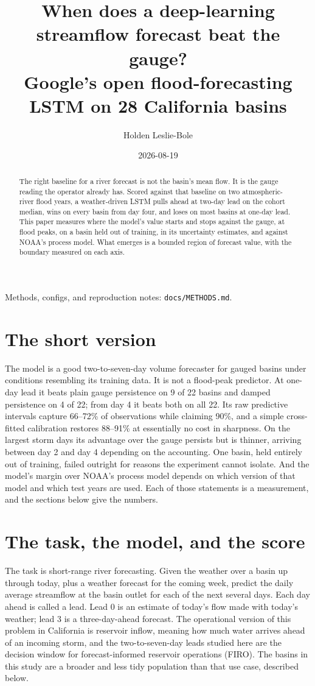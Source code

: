\documentclass[11pt]{article}
\title{When does a deep-learning streamflow forecast beat the gauge?\\
\large Google's open flood-forecasting LSTM on 28 California basins}
\author{Holden Leslie-Bole}
\date{2026-08-19}
\newcommand{\finding}[1]{\section*{#1}}
\begin{document}
\maketitle

\begin{abstract}
\noindent The right baseline for a river forecast is not the basin's mean flow. It is the
gauge reading the operator already has. Scored against that baseline on two
atmospheric-river flood years, a weather-driven LSTM pulls ahead at two-day lead on the
cohort median, wins on every basin from day four, and loses on most basins at one-day
lead. This paper measures where the model's value starts and stops against the gauge, at
flood peaks, on a basin held out of training, in its uncertainty estimates, and against
NOAA's process model. What emerges is a bounded region of forecast value, with the
boundary measured on each axis.
\end{abstract}

\noindent Methods, configs, and reproduction notes: \texttt{docs/METHODS.md}.

\finding{The short version}

The model is a good two-to-seven-day volume forecaster for gauged basins under conditions
resembling its training data. It is not a flood-peak predictor. At one-day lead it beats
plain gauge persistence on 9 of 22 basins and damped persistence on 4 of 22; from day 4 it
beats both on all 22. Its raw predictive intervals capture 66--72\% of observations while
claiming 90\%, and a simple cross-fitted calibration restores 88--91\% at essentially no
cost in sharpness. On the largest storm days its advantage over the gauge persists but is
thinner, arriving between day 2 and day 4 depending on the accounting. One basin, held
entirely out of training, failed outright for reasons the experiment cannot isolate. And
the model's margin over NOAA's process model depends on which version of that model and
which test years are used. Each of those statements is a measurement, and the sections
below give the numbers.

\finding{The task, the model, and the score}

The task is short-range river forecasting. Given the weather over a basin up through
today, plus a weather forecast for the coming week, predict the daily average streamflow
at the basin outlet for each of the next several days. Each day ahead is called a lead.
Lead 0 is an estimate of today's flow made with today's weather; lead 3 is a
three-day-ahead forecast. The operational version of this problem in California is
reservoir inflow, meaning how much water arrives ahead of an incoming storm, and the
two-to-seven-day leads studied here are the decision window for forecast-informed
reservoir operations (FIRO). The basins in this study are a broader and less tidy
population than that use case, described below.
\end{document}
